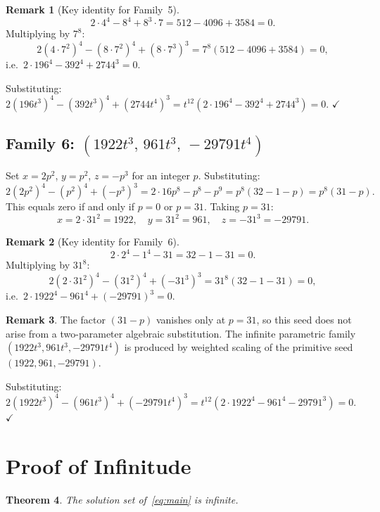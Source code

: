 \documentclass[12pt,a4paper]{article}
\newtheorem{theorem}{Theorem}[section]
\theoremstyle{definition}
\newtheorem{remark}[theorem]{Remark}
\begin{document}
\begin{remark}[Key identity for Family~5]
  \[
    2\cdot 4^4 - 8^4 + 8^3\cdot 7 = 512 - 4096 + 3584 = 0.
  \]
  Multiplying by $7^8$:
  \[
    2(4\cdot 7^2)^4 - (8\cdot 7^2)^4 + (8\cdot 7^3)^3
    = 7^8(512 - 4096 + 3584) = 0,
  \]
  i.e.\ $2\cdot 196^4 - 392^4 + 2744^3 = 0$.
\end{remark}

\noindent Substituting: $2(196t^3)^4 - (392t^3)^4 + (2744t^4)^3 = t^{12}(2\cdot 196^4 - 392^4 + 2744^3) = 0$. $\checkmark$

\subsection{Family 6: \texorpdfstring{$(1922t^3,\, 961t^3,\, -29791t^4)$}{(1922t³,961t³,-29791t⁴)}}

Set $x = 2p^2$, $y = p^2$, $z = -p^3$ for an integer $p$.  Substituting:
\[
  2(2p^2)^4 - (p^2)^4 + (-p^3)^3
  = 2\cdot 16p^8 - p^8 - p^9
  = p^8(32 - 1 - p)
  = p^8(31 - p).
\]
This equals zero if and only if $p = 0$ or $p = 31$.  Taking $p = 31$:
\[
  x = 2\cdot 31^2 = 1922,\quad y = 31^2 = 961,\quad z = -31^3 = -29791.
\]

\begin{remark}[Key identity for Family~6]
  \[
    2\cdot 2^4 - 1^4 - 31 = 32 - 1 - 31 = 0.
  \]
  Multiplying by $31^8$:
  \[
    2(2\cdot 31^2)^4 - (31^2)^4 + (-31^3)^3
    = 31^8(32 - 1 - 31) = 0,
  \]
  i.e.\ $2\cdot 1922^4 - 961^4 + (-29791)^3 = 0$.
\end{remark}

\begin{remark}
  The factor $(31 - p)$ vanishes only at $p = 31$, so this seed does not arise
  from a two-parameter algebraic substitution.  The infinite parametric family
  $(1922t^3, 961t^3, -29791t^4)$ is produced by weighted scaling of the primitive
  seed $(1922, 961, -29791)$.
\end{remark}

\noindent Substituting: $2(1922t^3)^4 - (961t^3)^4 + (-29791t^4)^3 = t^{12}(2\cdot 1922^4 - 961^4 - 29791^3) = 0$. $\checkmark$

\section{Proof of Infinitude}\label{sec:infinite}

\begin{theorem}\label{thm:infinite}
  The solution set of~\eqref{eq:main} is infinite.
\end{theorem}
\end{document}
